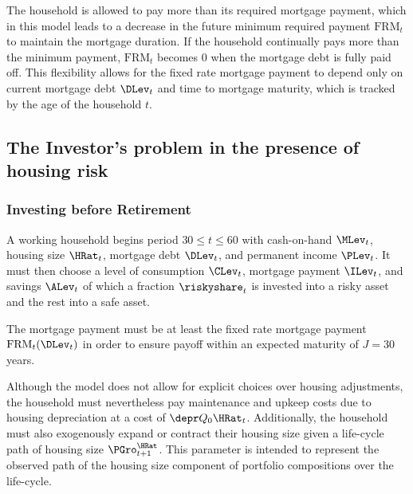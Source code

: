 \documentclass[PortfolioChoiceWithRiskyHousing]{subfiles}
\begin{document}
The household is allowed to pay more than its required mortgage payment, which in this model leads to a decrease in the future minimum required payment $\text{FRM}_{t}$ to maintain the mortgage duration. If the household continually pays more than the minimum payment, $\text{FRM}_{t}$ becomes $0$ when the mortgage debt is fully paid off. This flexibility allows for the fixed rate mortgage payment to depend only on current mortgage debt $\DLev_{t}$ and time to mortgage maturity, which is tracked by the age of the household $t$.

\subsection{The Investor's problem in the presence of housing risk}

\subsubsection{Investing before Retirement}

A working household begins period $30\le t \le 60$ with cash-on-hand $\MLev_{t}$, housing size $\HRat_{t}$, mortgage debt $\DLev_{t}$, and permanent income $\PLev_{t}$. It must then choose a level of consumption $\CLev_{t}$, mortgage payment $\ILev_{t}$, and savings $\ALev_{t}$ of which a fraction $\riskyshare_{t}$ is invested into a risky asset and the rest into a safe asset.

The mortgage payment must be at least the fixed rate mortgage payment $\text{FRM}_{t}(\DLev_{t})$ in order to ensure payoff within an expected maturity of $J=30$ years.

Although the model does not allow for explicit choices over housing adjustments, the household must nevertheless pay maintenance and upkeep costs due to housing depreciation at a cost of $\depr Q_{0} \HRat_{t}$. Additionally, the household must also exogenously expand or contract their housing size given a life-cycle path of housing size $\PGro^{\HRat}_{t+1}$. This parameter is intended to represent the observed path of the housing size component of portfolio compositions over the life-cycle.
\end{document}
